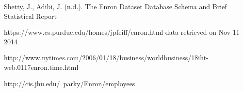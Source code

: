 \documentclass[12pt]{article}
\begin{document}
\begin{thebibliography}{9}

Shetty, J., Adibi, J. (n.d.). The Enron Dataset
Database Schema and Brief Statistical Report

https://www.cs.purdue.edu/homes/jpfeiff/enron.html
data retrieved on Nov 11 2014

http://www.nytimes.com/2006/01/18/business/worldbusiness/18iht-web.0117enron.time.html

http://cis.jhu.edu/~parky/Enron/employees

\end{thebibliography}
\end{document}
